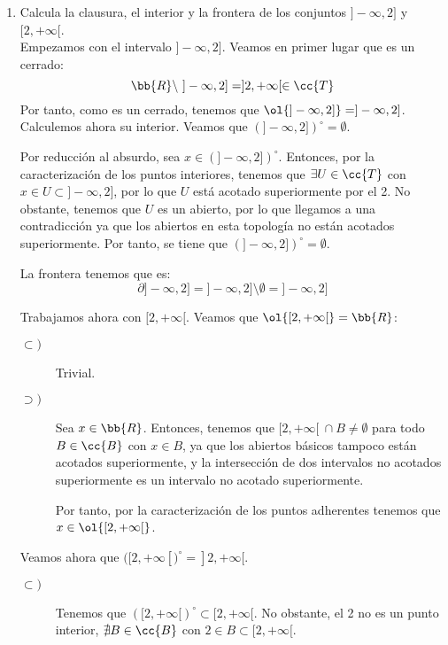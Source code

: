 \begin{ejercicio}
\begin{enumerate}[label=\alph*)]
        \item Calcula la clausura, el interior y la frontera de los conjuntos $]-\infty, 2]$ y $[2,+\infty[$.\\

        Empezamos con el intervalo $]-\infty, 2]$. Veamos en primer lugar que es un cerrado:
        \begin{equation*}
            \bb{R}\setminus~]-\infty, 2] = ]2,+\infty[\in \cc{T}
        \end{equation*}
        Por tanto, como es un cerrado, tenemos que $\ol{]-\infty, 2]}=]-\infty, 2]$. 
        Calculemos ahora su interior. Veamos que $(]-\infty, 2])^\circ = \emptyset$.

        Por reducción al absurdo, sea $x\in (]-\infty, 2])^\circ$. Entonces, por la caracterización de los puntos interiores, tenemos que $\exists U\in \cc{T}$ con $x\in U\subset ]-\infty, 2]$, por lo que $U$ está acotado superiormente por el 2. No obstante, tenemos que $U$ es un abierto, por lo que llegamos a una contradicción ya que los abiertos en esta topología no están acotados superiormente. Por tanto, se tiene que $(]-\infty, 2])^\circ = \emptyset$.

        La frontera tenemos que es:
        \begin{equation*}
            \partial ]-\infty, 2] = ]-\infty, 2]\setminus \emptyset = ]-\infty, 2]
        \end{equation*}
        \vspace{1cm}

        Trabajamos ahora con $[2,+\infty[$. Veamos que $\ol{[2,+\infty[}=\bb{R}$:
        \begin{description}
            \item[$\subset)$] Trivial.
            \item[$\supset)$] Sea $x\in \bb{R}$. Entonces, tenemos que $[2,+\infty[~\cap B\neq \emptyset$ para todo $B\in \cc{B}$ con $x\in B$, ya que los abiertos básicos tampoco están acotados superiormente, y la intersección de dos intervalos no acotados superiormente es un intervalo no acotado superiormente.
            
            Por tanto, por la caracterización de los puntos adherentes tenemos que $x\in \ol{[2,+\infty[}$.
        \end{description}

        Veamos ahora que $([2,+\infty[)^\circ=]2,+\infty[$.
        \begin{description}
            \item[$\subset)$] Tenemos que $([2,+\infty[)^\circ\subset [2,+\infty[$. No obstante, el 2 no es un punto interior, $\nexists B\in \cc{B}$ con $2\in B\subset [2,+\infty[$.


\end{description}
\end{enumerate}
\end{ejercicio}
